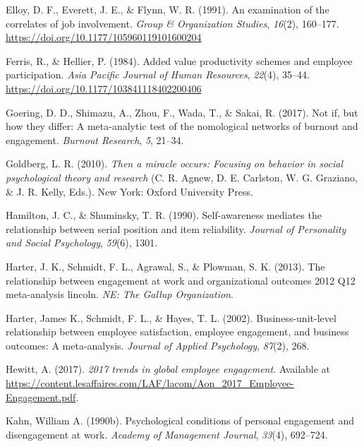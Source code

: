\documentclass[
  man]{apa6}
\newlength{\cslhangindent}
\newlength{\cslentryspacingunit} %
\newenvironment{CSLReferences}[2] %
 {%
  \setlength{\parindent}{0pt}
  \ifodd #1
  \let\oldpar\par
  \def\par{\hangindent=\cslhangindent\oldpar}
  \fi
  \setlength{\parskip}{#2\cslentryspacingunit}
 }%
 {}
\begin{document}
\begin{CSLReferences}{1}{0}
\leavevmode{}%
Elloy, D. F., Everett, J. E., \& Flynn, W. R. (1991). An examination of the correlates of job involvement. \emph{Group \& Organization Studies}, \emph{16}(2), 160--177. \url{https://doi.org/10.1177/105960119101600204}

\leavevmode{}%
Ferris, R., \& Hellier, P. (1984). Added value productivity schemes and employee participation. \emph{Asia Pacific Journal of Human Resources}, \emph{22}(4), 35--44. \url{https://doi.org/10.1177/103841118402200406}

\leavevmode{}%
Goering, D. D., Shimazu, A., Zhou, F., Wada, T., \& Sakai, R. (2017). Not if, but how they differ: A meta-analytic test of the nomological networks of burnout and engagement. \emph{Burnout Research}, \emph{5}, 21--34.

\leavevmode{}%
Goldberg, L. R. (2010). \emph{Then a miracle occurs: Focusing on behavior in social psychological theory and research} (C. R. Agnew, D. E. Carlston, W. G. Graziano, \& J. R. Kelly, Eds.). New York: Oxford University Press.

\leavevmode{}%
Hamilton, J. C., \& Shuminsky, T. R. (1990). Self-awareness mediates the relationship between serial position and item reliability. \emph{Journal of Personality and Social Psychology}, \emph{59}(6), 1301.

\leavevmode{}%
Harter, J. K., Schmidt, F. L., Agrawal, S., \& Plowman, S. K. (2013). The relationship between engagement at work and organizational outcomes 2012 Q12 meta-analysis lincoln. \emph{{NE}: The Gallup Organization}.

\leavevmode{}%
Harter, James K., Schmidt, F. L., \& Hayes, T. L. (2002). Business-unit-level relationship between employee satisfaction, employee engagement, and business outcomes: A meta-analysis. \emph{Journal of Applied Psychology}, \emph{87}(2), 268.

\leavevmode{}%
Hewitt, A. (2017). \emph{2017 trends in global employee engagement}. Available at \url{https://content.lesaffaires.com/LAF/lacom/Aon_2017_Employee-Engagement.pdf}.

\leavevmode{}%
Kahn, William A. (1990b). Psychological conditions of personal engagement and disengagement at work. \emph{Academy of Management Journal}, \emph{33}(4), 692--724.


\end{CSLReferences}
\end{document}

